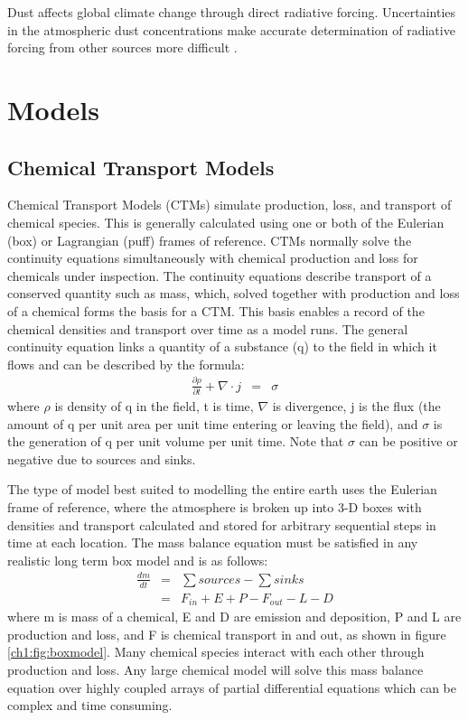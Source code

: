   Dust affects global climate change through direct radiative forcing.
  Uncertainties in the atmospheric dust concentrations make accurate determination of radiative forcing from other sources more difficult \citep{IPCC_2013_chap8}.


\section{Models}
\label{ch1:sec:models}

  \subsection{Chemical Transport Models}
  
    Chemical Transport Models (CTMs) simulate production, loss, and transport of chemical species.
    This is generally calculated using one or both of the Eulerian (box) or Lagrangian (puff) frames of reference.
    CTMs normally solve the continuity equations simultaneously with chemical production and loss for chemicals under inspection. 
    The continuity equations describe transport of a conserved quantity such as mass, which, solved together with production and loss of a chemical forms the basis for a CTM.
    This basis enables a record of the chemical densities and transport over time as a model runs.
    The general continuity equation links a quantity of a substance (q) to the field in which it flows and can be described by the formula:
    \begin{eqnarray*}
	\frac{\partial \rho}{\partial t} + \nabla \cdot j &=& \sigma 
    \end{eqnarray*}
    where $\rho$ is density of q in the field, t is time, $\nabla$ is divergence, j is the flux (the amount of q per unit area per unit time entering or leaving the field), and $\sigma$ is the generation of q per unit volume per unit time.
    Note that $\sigma$ can be positive or negative due to sources and sinks.

    The type of model best suited to modelling the entire earth uses the Eulerian frame of reference, where the atmosphere is broken up into 3-D boxes with densities and transport calculated and stored for arbitrary sequential steps in time at each location.
    The mass balance equation must be satisfied in any realistic long term box model and is as follows: 
    \begin{eqnarray*}
	\frac{dm}{dt} &=& \sum{sources}-\sum{sinks} \\
	&=& F_{in} + E + P - F_{out} - L - D 
    \end{eqnarray*}
    where m is mass of a chemical, E and D are emission and deposition, P and L are production and loss, and F is chemical transport in and out, as shown in figure \ref{ch1:fig:boxmodel}.
    Many chemical species interact with each other through production and loss. 
    Any large chemical model will solve this mass balance equation over highly coupled arrays of partial differential equations which can be complex and time consuming.


